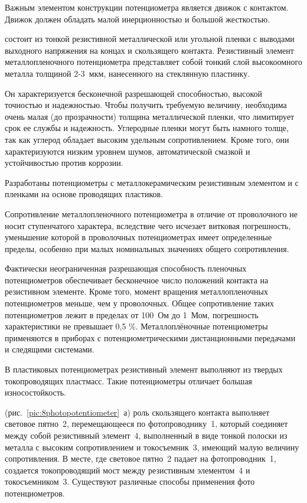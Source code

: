 Важным элементом конструкции потенциометра является движок с контактом. Движок должен обладать малой инерционностью и большой жесткостью. 

 состоит из тонкой резистивной металлической или угольной пленки с выводами выходного напряжения на концах и скользящего контакта. 
Резистивный элемент металлопленочного потенциометра представляет собой тонкий слой высокоомного металла толщиной 2-3~мкм, нанесенного на стеклянную пластинку.

Он характеризуется бесконечной разрешающей способностью, высокой точностью и надежностью. 
Чтобы получить требуемую величину, необходима очень малая (до прозрачности) толщина металлической пленки, что лимитирует срок ее службы и надежность. Углеродные пленки могут быть намного толще, так как углерод обладает высоким удельным сопротивлением. 
Кроме того, они характеризуются низким уровнем шумов, автоматической смазкой и устойчивостью против коррозии.

Разработаны потенциометры с металлокерамическим резистивным элементом и с пленками на основе проводящих пластиков.

Сопротивление металлопленочного потенциометра в отличие от проволочного не носит ступенчатого характера, вследствие чего исчезает витковая погрешность, уменьшение которой в проволочных потенциометрах имеет определенные пределы, особенно при малых номинальных значениях общего сопротивления. 

Фактически неограниченная разрешающая способность пленочных потенциометров обеспечивает бесконечное число положений контакта на резистивном элементе. Кроме того, момент вращения металлопленочных потенциометров меньше, чем у проволочных. 
Общее сопротивление таких потенциометров лежит в пределах от 100~Ом до 1~Мом, погрешность характеристики не превышает 0,5 \%. 
Металлоплёночные потенциометры применяются в приборах с потенциометрическими дистанционными передачами и следящими системами.

В пластиковых потенциометрах резистивный элемент выполняют из твердых токопроводящих пластмасс. Такие потенциометры отличает большая износостойкость.

 (рис.~\ref{pic:8photopotentiometer}~а) роль скользящего контакта выполняет световое пятно~2, перемещающееся по фотопроводнику~1, который соединяет между собой резистивный элемент~4, выполненный в виде тонкой полоски из металла с высоким сопротивлением и токосъемник~3, имеющий малую величину сопротивления. В месте, где световое пятно~2 падает на фотопроводник~1, создается токопроводящий мост между резистивным элементом~4 и токосъемником~3. Существуют различные способы применения фото потенциометров. 

